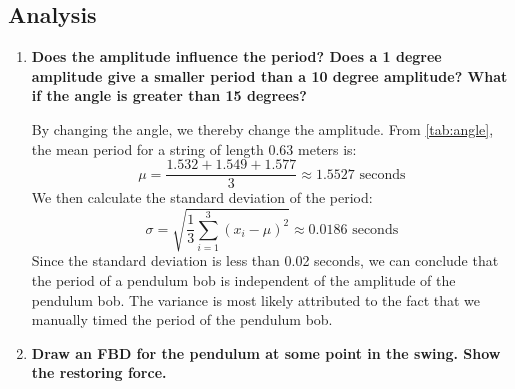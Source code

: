 \documentclass[article, 12pt]{article}
\def\rope#1{ \draw[black,line width=1.4] #1; \draw[rope,line width=1.1] #1; }
\begin{document}
    \subsection{Analysis}
    \begin{enumerate}[1)]
        \item \textbf{Does the amplitude influence the period?  Does a 1 degree amplitude give a smaller period than a 10 degree amplitude?  What if the angle is greater than 15 degrees?}

        By changing the angle, we thereby change the amplitude. From \autoref{tab:angle}, the mean period for a string of length 0.63 meters is:
        \begin{equation}            \label{eq:mean}
            \mu = \frac{1.532 + 1.549 + 1.577}{3} \approx 1.5527 \text{ seconds}
        \end{equation}
    We then calculate the standard deviation of the period:
    \begin{equation}        \label{eq:std}
        \sigma = \sqrt{\frac{1}{3}\sum_{i=1}^{3}(x_i - \mu)^2} \approx 0.0186 \text{ seconds}
    \end{equation}
    Since the standard deviation is less than 0.02 seconds, we can conclude that the period of a pendulum bob is independent of the amplitude of the pendulum bob. The variance is most likely attributed to the fact that we manually timed the period of the pendulum bob. \\
    \item \textbf{Draw an FBD for the pendulum at some point in the swing.  Show the restoring force.}
    \begin{figure}[H]
        \centering
    \def\L{4}  %
    \def\ang{30} %
    \def\R{0.25} %
    \def\F{1.0}  %
\end{figure}
\end{enumerate}
\end{document}
